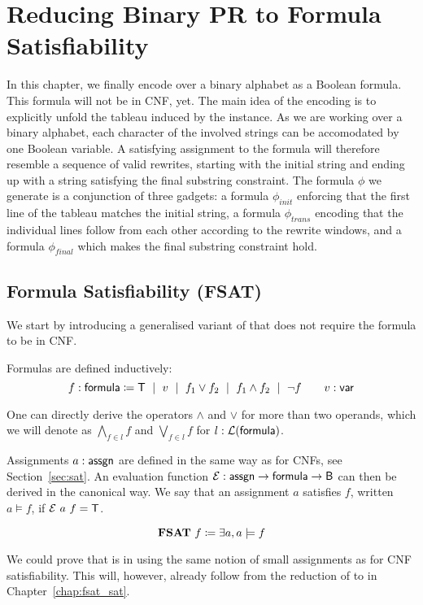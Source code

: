 
\chapter{Reducing Binary PR to Formula Satisfiability}\label{chap:bpr_fsat}
In this chapter, we finally encode \PR{} over a binary alphabet as a Boolean formula. This formula will not be in CNF, yet.
The main idea of the encoding is to explicitly unfold the tableau induced by the \BPR{} instance.
As we are working over a binary alphabet, each character of the involved strings can be accomodated by one Boolean variable. A satisfying assignment to the formula will therefore resemble a sequence of valid rewrites, starting with the initial string and ending up with a string satisfying the final substring constraint.
The formula $\phi$ we generate is a conjunction of three gadgets: a formula $\phi_{init}$ enforcing that the first line of the tableau matches the initial string, a formula $\phi_{trans}$ encoding that the individual lines follow from each other according to the rewrite windows, and a formula $\phi_{final}$ which makes the final substring constraint hold. 

\newcommand{\formula}{\textsf{formula}}
\section{Formula Satisfiability (FSAT)}
We start by introducing a generalised variant of \SAT{} that does not require the formula to be in CNF.

Formulas are defined inductively: 
\[f : \formula \defeq \btrue \bnfmid v \bnfmid f_1 \lor f_2 \bnfmid f_1 \land f_2 \bnfmid \lnot f \qquad v : \bvar \]

One can directly derive the operators $\land$ and $\lor$ for more than two operands, which we will denote as $\bigwedge_{f \in l} f$ and $\bigvee_{f \in l} f$ for $ l : \listsof{\formula}$. 

Assignments $a : \textsf{assgn}$ are defined in the same way as for CNFs, see Section~\ref{sec:sat}.
An evaluation function $\eval : \assgn \rightarrow \formula \rightarrow \bool$ can then be derived in the canonical way. We say that an assignment $a$ satisfies $f$, written $a \models f$, if $\mathcal{E}~a~f = \mathsf{T}$.

\begin{definition}
  \[\textbf{FSAT}{}~f \coloneqq \exists a, a \models f \]
\end{definition}

We could prove that \fsat{} is in \NP{} using the same notion of small assignments as for CNF satisfiability. This will, however, already follow from the reduction of \fsat{} to \SAT{} in Chapter~\ref{chap:fsat_sat}. 

